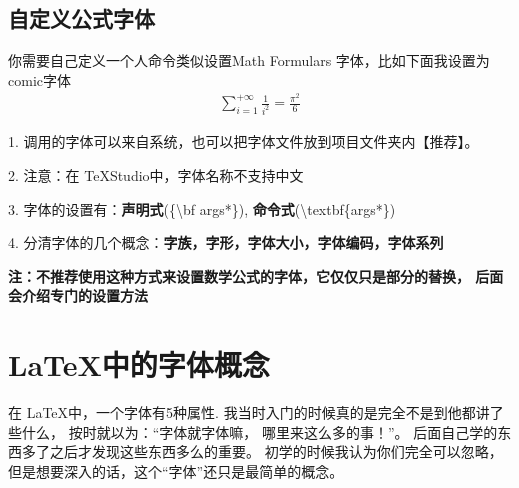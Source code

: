 \documentclass[fontset=windows, 12pt]{article}
\begin{document}
\subsection{自定义公式字体}
你需要自己定义一个人命令类似设置Math Formulars 字体，比如下面我设置为comic字体
\begin{align}
    \boxed{
     {    
        \sum_{i=1}^{+\infty}{\frac{1}{i^2}} = \frac{\pi^2}{6}
    }}
\end{align}

\begin{tcolorbox}[colback=red!5!white,colframe=red!75!black,title=字体注意事项]
  1. 调用的字体可以来自系统，也可以把字体文件放到项目文件夹内【推荐】。

  2. 注意：在 \TeX Studio中，字体名称不支持中文

  3. 字体的设置有：\textbf{声明式}({\ttfamily \{\textbackslash bf args*\}}), \textbf{命令式}({\ttfamily \textbackslash textbf\{args*\}})

  4. 分清字体的几个概念：\textbf{字族，字形，字体大小，字体编码，字体系列}

  \textbf{注：不推荐使用这种方式来设置数学公式的字体，它仅仅只是部分的替换， 后面会介绍专门的设置方法}
\end{tcolorbox}

\section{\LaTeX 中的字体概念}
在 \LaTeX 中，一个字体有5种属性. 我当时入门的时候真的是完全不是到他都讲了些什么，
按时就以为：“字体就字体嘛， 哪里来这么多的事！”。 后面自己学的东西多了之后才发现这些东西多么的重要。
初学的时候我认为你们完全可以忽略，但是想要深入的话，这个“字体”还只是最简单的概念。

\vspace*{4em}
\end{document}
